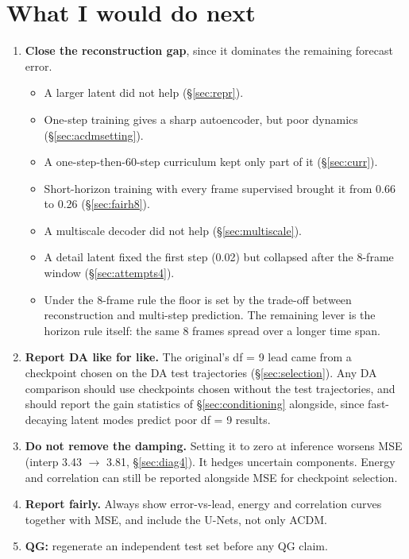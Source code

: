 \documentclass[10.5pt,a4paper]{article}
\begin{document}
\section{What I would do next}\label{sec:next}
\begin{enumerate}[leftmargin=*]
\item \textbf{Close the reconstruction gap}, since it dominates the remaining forecast error.
  \begin{itemize}
  \item A larger latent did not help (\S\ref{sec:repr}).
  \item One-step training gives a sharp autoencoder, but poor dynamics
    (\S\ref{sec:acdmsetting}).
  \item A one-step-then-60-step curriculum kept only part of it (\S\ref{sec:curr}).
  \item Short-horizon training with every frame supervised brought it from 0.66 to 0.26
    (\S\ref{sec:fairh8}).
  \item A multiscale decoder did not help (\S\ref{sec:multiscale}).
  \item A detail latent fixed the first step (0.02) but collapsed after the 8-frame window
    (\S\ref{sec:attempts4}).
  \item Under the 8-frame rule the floor is set by the trade-off between reconstruction and
    multi-step prediction. The remaining lever is the horizon rule itself: the same 8 frames
    spread over a longer time span.
  \end{itemize}
\item \textbf{Report DA like for like.} The original's df = 9 lead came from a checkpoint
  chosen on the DA test trajectories (\S\ref{sec:selection}). Any DA comparison should use
  checkpoints chosen without the test trajectories, and should report the gain statistics of
  \S\ref{sec:conditioning} alongside, since fast-decaying latent modes predict poor df = 9
  results.
\item \textbf{Do not remove the damping.} Setting it to zero at inference worsens MSE
  (interp 3.43 $\to$ 3.81, \S\ref{sec:diag4}). It hedges uncertain components. Energy and
  correlation can still be reported alongside MSE for checkpoint selection.
\item \textbf{Report fairly.} Always show error-vs-lead, energy and correlation curves together
  with MSE, and include the U-Nets, not only ACDM.
\item \textbf{QG:} regenerate an independent test set before any QG claim.
\end{enumerate}
\end{document}
